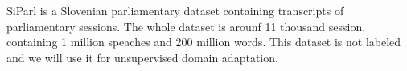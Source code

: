 \documentclass[fleqn,moreauthors,10pt]{ds_report}
\begin{document}
SiParl is a Slovenian parliamentary dataset containing transcripts of parliamentary sessions.
The whole dataset is arounf 11 thousand session, containing 1 million speaches and 200 million words.
This dataset is not labeled and we will use it for unsupervised domain adaptation.





\end{document}

